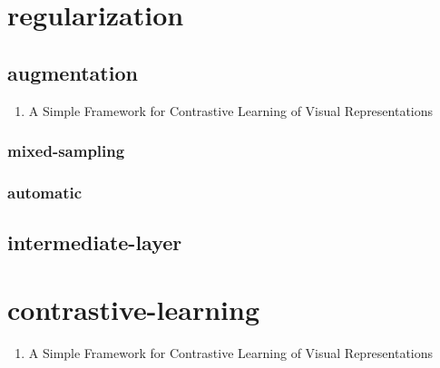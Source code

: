 \documentclass[acmlarge]{acmart}
\begin{document}
\section{regularization}
\begin{enumerate}
	\subsection{augmentation}
	\begin{enumerate}
		\subsubsection{mixed-sampling}
		\begin{enumerate}
		\end{enumerate}
		\subsubsection{automatic}
		\begin{enumerate}
		\end{enumerate}
		\item A Simple Framework for Contrastive Learning of Visual Representations \cite{Chen2020ASF}
	\end{enumerate}
		\subsubsection{mixed-sampling}
		\begin{enumerate}
		\end{enumerate}
		\subsubsection{automatic}
		\begin{enumerate}
		\end{enumerate}
	\subsection{intermediate-layer}
	\begin{enumerate}
	\end{enumerate}
\end{enumerate}
\section{contrastive-learning}
\begin{enumerate}
	\item A Simple Framework for Contrastive Learning of Visual Representations \cite{Chen2020ASF}
\end{enumerate}
\end{document}
